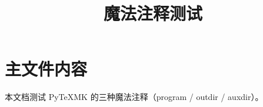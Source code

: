 \documentclass{article}
\title{魔法注释测试}
\author{}
\date{}
\begin{document}
\maketitle

\tableofcontents

\section{主文件内容}

本文档测试 PyTeXMK 的三种魔法注释（program / outdir / auxdir）。


\end{document}
